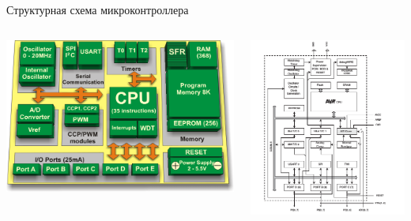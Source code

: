 \begin{frame}{Структурная схема микроконтроллера}
    \begin{columns}
        \centering
        \includegraphics[width=1.1\linewidth]{../Figures/microstruct.png}

        \centering
        \includegraphics[width=1.1\linewidth]{../Figures/atmegablock.png}
    \end{columns}

    \centering
\end{frame}

